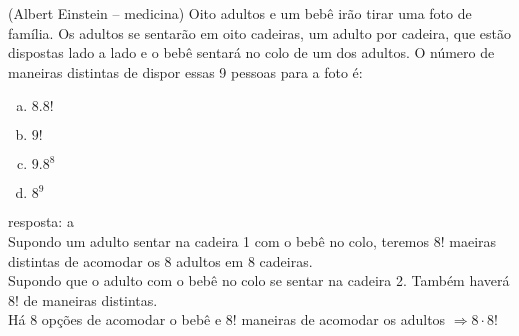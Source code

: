 \begin{ex}
   (Albert Einstein – medicina) Oito adultos e um bebê irão tirar uma foto de família. Os adultos se sentarão em oito cadeiras, um adulto por cadeira, que estão dispostas lado a lado e o bebê sentará no colo de um dos adultos. O número de maneiras distintas de dispor essas 9 pessoas para a foto é:
      \begin{enumerate} [(a)]
          \item $8.8!$
          \item $9!$
          \item $9.8^8$
          \item $8^9$
      \end{enumerate}
       \begin{sol}
       resposta: a \\
       Supondo um adulto sentar na cadeira 1 com o bebê no colo, teremos $8!$ maeiras distintas de acomodar os 8 adultos em 8 cadeiras.\\
       Supondo que o adulto com o bebê no colo se sentar na cadeira 2. Também haverá $8!$ de maneiras distintas.\\
       Há 8 opções de acomodar o bebê e 8! maneiras de acomodar os adultos $\Longrightarrow 8\cdot8!$
       \end{sol}
 \end{ex}